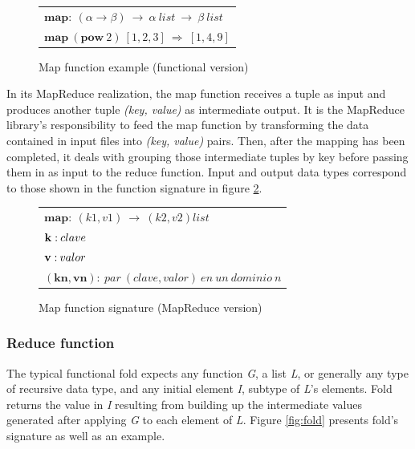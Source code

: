 \begin{figure}[tbp]
\begin{center}
\begin{tabular}{|l|}
\hline
$\mathbf{map:} \: \left ( \alpha \rightarrow \beta \right ) \: \rightarrow \: \alpha \: list \: \rightarrow \: \beta \: list$ \\
$\mathbf{map} \: \left( \mathbf{pow}\:2 \right) \: \left[ 1,2,3 \right] \: \Rightarrow \: \left[ 1,4,9 \right ]$ \\
\hline
\end{tabular}
\caption{Map function example (functional version)}
\label{fig:functionalmap}
\end{center}
\end{figure}

In its MapReduce realization, the map function receives a tuple as input and produces another tuple \emph{(key, value)} as intermediate output. It is the MapReduce library's responsibility to feed the map function by transforming the data contained in input files into \emph{(key, value)} pairs. Then, after the mapping has been completed, it deals with grouping those intermediate tuples by key before passing them in as input to the reduce function. Input and output data types correspond to those shown in the function signature in figure \ref{fig:mapreducemap}.

\begin{figure}[tbp]
\begin{center}
\begin{tabular}{|l|}
\hline
$\mathbf{map:} \: \left( k1,v1 \right) \: \rightarrow \: \left( k2,v2 \right) list$ \\
$\mathbf{k:} \: clave \linebreak$ \\
$\mathbf{v:} \: valor \linebreak$ \\
$\mathbf{\left(kn,vn \right):} \: par \: \left( clave,valor \right) \: en \: un \: dominio \: n$ \\
\hline
\end{tabular}
\caption{Map function signature (MapReduce version)}
\label{fig:mapreducemap}
\end{center}
\end{figure}


\subsubsection{Reduce function}\label{reduce}
\noindent The typical functional fold expects any function \emph{G}, a list \emph{L}, or generally any type of recursive data type, and any initial element \emph{I}, subtype of \emph{L}'s elements. Fold returns the value in \emph{I} resulting from building up the intermediate values generated after applying \emph{G} to each element of \emph{L}. Figure \ref{fig:fold} presents fold's signature as well as an example.

